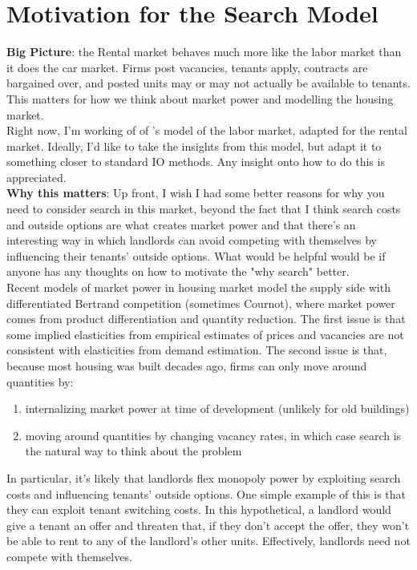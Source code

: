 

\section{Motivation for the Search Model}

\textbf{Big Picture}: the Rental market behaves much more like the labor market than it does the car market. Firms post vacancies, tenants apply, contracts are bargained over, and posted units may or may not actually be available to tenants. This matters for how we think about market power and modelling the housing market. \\

Right now, I'm working of of \cite{jarosh-search-2024}'s model of the labor market, adapted for the rental market. Ideally, I'd like to take the insights from this model, but adapt it to something closer to standard IO methods. Any insight onto how to do this is appreciated.\\

\textbf{Why this matters}: 
Up front, I wish I had some better reasons for why you need to consider search in this market, beyond the fact that I think search costs and outside options are what creates market power and that there's an interesting way in which landlords can avoid competing with themselves by influencing their tenants' outside options. What would be helpful would be if anyone has any thoughts on how to motivate the "why search" better.\\

Recent models of market power in housing market model the supply side with differentiated Bertrand competition (sometimes Cournot), where market power comes from product differentiation and quantity reduction. The first issue is that some implied elasticities from empirical estimates of prices and vacancies are not consistent with elasticities from demand estimation. The second issue is that, because most housing was built decades ago, firms can only move around quantities by:\\
\begin{enumerate}
    \item internalizing market power at time of development (unlikely for old buildings)
    \item moving around quantities by changing vacancy rates, in which case search is the natural way to think about the problem
\end{enumerate}


In particular, it's  likely that landlords flex monopoly power by exploiting search costs and influencing tenants' outside options. One simple example of this is that they can exploit tenant switching costs. In this hypothetical, a landlord would give a tenant an offer and threaten that, if they don't accept the offer, they won't be able to rent to any of the landlord's other units. Effectively, landlords need not compete with themselves.

